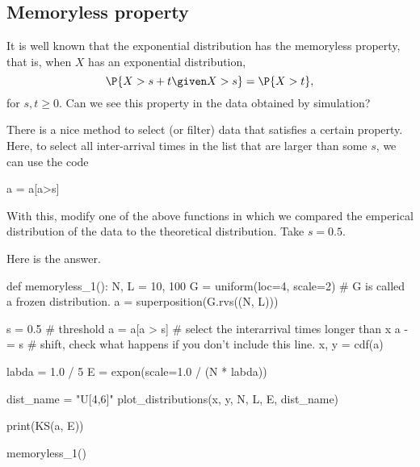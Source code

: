 \subsection{Memoryless property}

It is well known that the exponential distribution has the memoryless property, that is, when $X$ has an exponential distribution,
\begin{equation*}
\P{X>s + t \given X> s} = \P{X>t},
\end{equation*}
for $s, t \geq 0$.
Can we see this property in the data obtained by  simulation?

\begin{exercise}
  There is a nice  method to select (or filter) data that satisfies a certain property.
  Here, to select all inter-arrival times in the list  that are larger than some $s$, we can use the code
  \begin{pynotangle}
    a = a[a>s]
  \end{pynotangle}
With this,  modify one of the above functions in which we compared the emperical distribution of the data to the theoretical distribution. Take $s=0.5$.

  \begin{solution}
Here is the answer.
\begin{pyverbatim}
def memoryless_1():
    N, L = 10, 100
    G = uniform(loc=4, scale=2)  # G is called a frozen distribution.
    a = superposition(G.rvs((N, L)))

    s = 0.5  # threshold
    a = a[a > s]  # select the interarrival times longer than x
    a -= s  # shift, check what happens if you don't include this line.
    x, y = cdf(a)

    labda = 1.0 / 5
    E = expon(scale=1.0 / (N * labda))

    dist_name = "U[4,6]"
    plot_distributions(x, y, N, L, E, dist_name)

    print(KS(a, E))


memoryless_1()
\end{pyverbatim}
  \end{solution}
\end{exercise}

